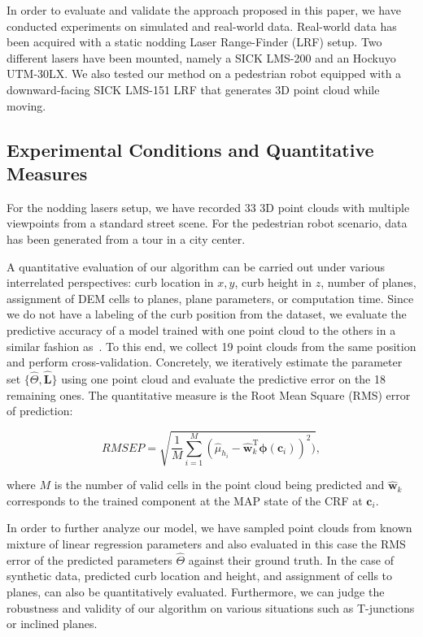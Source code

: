 In order to evaluate and validate the approach proposed in this paper, we have
conducted experiments on simulated and real-world data. Real-world data
has been acquired with a static nodding Laser Range-Finder (LRF) setup. Two
different lasers have been mounted, namely a SICK LMS-200 and an Hockuyo
UTM-30LX. We also tested our method on a pedestrian robot equipped with a
downward-facing SICK LMS-151 LRF that generates 3D point cloud while moving.

\subsection{Experimental Conditions and Quantitative Measures}

For the nodding lasers setup, we have recorded 33 3D point clouds with multiple
viewpoints from a standard street scene. For the pedestrian robot scenario, data
has been generated from a tour in a city center.

A quantitative evaluation of our algorithm can be carried out under various
interrelated perspectives: curb location in $x,y$, curb height in $z$,
number of planes, assignment of DEM cells to planes, plane parameters, or
computation time. Since we do not have a labeling of the curb position from
the dataset, we evaluate the predictive accuracy of a model trained
with one point cloud to the others in a similar fashion as~\cite{faria10fitting}.
To this end, we collect 19 point clouds from the same position and perform
cross-validation. Concretely, we iteratively estimate the parameter set
$\{\hat{\Theta},\mathbf{\hat{L}}\}$ using one point cloud and evaluate the
predictive error on the 18 remaining ones. The quantitative measure is the Root
Mean Square (RMS) error of prediction:

\begin{equation}
\label{eqn:rmspred}
RMSEP=\sqrt{\frac{1}{M}\sum_{i=1}^M(\hat{\mu}_{h_i}-\mathbf{\hat{w}}_k^\text{T}
\boldsymbol{\phi}(\mathbf{c}_i))^ 2)},
\end{equation}

where $M$ is the number of valid cells in the point cloud being predicted and
$\mathbf{\hat{w}}_k$ corresponds to the trained component at the MAP state of
the CRF at $\mathbf{c}_i$.

In order to further analyze our model, we have sampled point clouds from known
mixture of linear regression parameters and also evaluated in this case the RMS
error of the predicted parameters $\hat{\Theta}$ against their ground truth. In
the case of synthetic data, predicted curb location and height, and assignment
of cells to planes, can also be quantitatively evaluated. Furthermore, we can
judge the robustness and validity of our algorithm on various situations such
as T-junctions or inclined planes.


